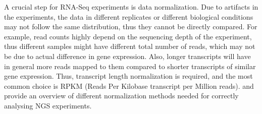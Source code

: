 A crucial step for RNA-Seq experiments is data normalization. Due to artifacts in the experiments, the data in different replicates or different biological conditions may not follow the same distribution, thus they cannot be directly compared. For example, read counts highly depend on the sequencing depth of the experiment, thus different samples might have different total number of reads, which may not be due to actual difference in gene expression. Also, longer transcripts will have in general more reads mapped to them compared to shorter transcripts of similar gene expression. Thus, transcript length normalization is required, and the most common choice is RPKM (Reads Per Kilobase transcript per Million reads). \citet{Robinson2010} and \citet{Aleksic2014} provide an overview of different normalization methods needed for correctly analysing NGS experiments.
